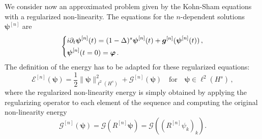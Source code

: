 \documentclass[12pt,a4paper]{amsart}
\newtheorem{remark}[theorem]{Remark}
\numberwithin{equation}{section}
\newcommand{\ulg}{\boldsymbol{g}}
\newcommand{\ulpsi}{\boldsymbol{\psi}}
\newcommand{\ulphi}{\boldsymbol{\varphi}}
\newcommand{\Clip}[1]{L_{#1}}
\begin{document}
	We consider now an approximated problem given by the Kohn-Sham equations with a regularized non-linearity. The equations for the $n$-dependent solutions $ \ulpsi^{[n]} $ are
	\begin{equation}
		\label{eq:Kohn_Sham_reg}
		\begin{dcases}
			i \partial_t \ulpsi^{[n]}(t) = (1-\Delta)^s \ulpsi^{[n]}(t) +  \ulg^{[n]} (\ulpsi^{[n]}(t)) \, ,\\
			\ulpsi^{[n]}(t=0)= \ulphi  \, .
		\end{dcases}
	\end{equation}
	The definition of the energy has to be adapted for these regularized equations:
	\begin{equation*}
		\mathcal{E}^{[n]}(\ulpsi) = \frac{1}{2} \| \ulpsi \|_{\ell^2(H^{s})}^2 +  \mathscr{G}^{[n]}(\ulpsi) \quad \text{for} \quad \ulpsi \in \ell^2(H^{s})\,,
	\end{equation*}
	where the regularized non-linearity energy is simply obtained by applying the regularizing operator to each element of the sequence and computing the original non-linearity energy
	\begin{equation}\label{def:approx_nonlin_energy}
		\mathscr{G}^{[n]}(\ulpsi) = \mathscr{G} (R^{[n]}\ulpsi)= \mathscr{G} ((R^{[n]}\psi_k)_k) .
	\end{equation}
	
\end{document}
